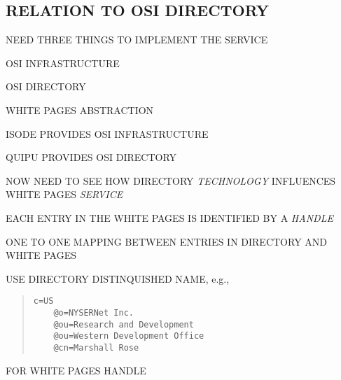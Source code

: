 \begin{bwslide}
\part*	{RELATION TO OSI DIRECTORY}\bf

\begin{nrtc}
\item	NEED THREE THINGS TO IMPLEMENT THE SERVICE
    \begin{nrtc}
    \item	OSI INFRASTRUCTURE

    \item	OSI DIRECTORY

    \item	WHITE PAGES ABSTRACTION
    \end{nrtc}

\item	ISODE PROVIDES OSI INFRASTRUCTURE

\item	QUIPU PROVIDES OSI DIRECTORY

\item	NOW NEED TO SEE HOW DIRECTORY \emph{TECHNOLOGY} INFLUENCES
	WHITE PAGES \emph{SERVICE}
\end{nrtc}
\end{bwslide}


\begin{bwslide}

\begin{nrtc}
\item	EACH ENTRY IN THE WHITE PAGES IS IDENTIFIED BY A \emph{HANDLE}

\item	ONE TO ONE MAPPING BETWEEN ENTRIES IN DIRECTORY AND WHITE PAGES

\item	USE DIRECTORY DISTINQUISHED NAME, e.g.,
\begin{quote}\begin{verbatim}
c=US
    @o=NYSERNet Inc.
    @ou=Research and Development
    @ou=Western Development Office
    @cn=Marshall Rose
\end{verbatim}\end{quote}
FOR WHITE PAGES HANDLE
\end{nrtc}
\end{bwslide}


